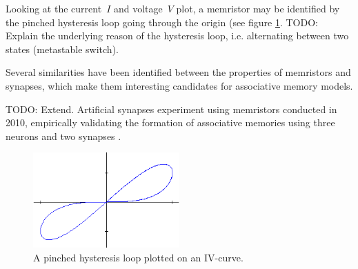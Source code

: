 
Looking at the current~$I$ and voltage~$V$ plot, a memristor may be identified by the pinched hysteresis loop going through the origin (see figure \ref{fig:pinched_hysteresis}. TODO: Explain the underlying reason of the hysteresis loop, i.e. alternating between two states (metastable switch).

Several similarities have been identified between the properties of memristors and synapses, which make them interesting candidates for associative memory models.

TODO: Extend. Artificial synapses experiment using memristors conducted in 2010, empirically validating the formation of associative memories using three neurons and two synapses \cite{memristor_conditioning}.

%

\begin{figure}[htbp]
	\begin{center}
		\includegraphics[width=0.5\textwidth]{inc/pinched_hysteresis.png}
		\caption{A pinched hysteresis loop plotted on an IV-curve.\protect\footnotemark}
		\label{fig:pinched_hysteresis}
	\end{center}
\end{figure}

